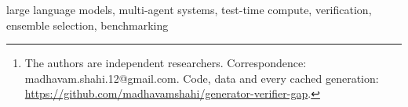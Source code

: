 \documentclass[journal]{IEEEtran}
\newif\ifanon            \anonfalse
\newif\ifwithappendix
\newif\ifpubid           \pubidfalse
\begin{document}
\title{\papertitle}

\ifanon
  \ifCLASSOPTIONconference
    \author{\IEEEauthorblockN{Anonymous Submission}
    \IEEEauthorblockA{Paper ID \#XXXX}}
  \else
    \author{Anonymous Submission}
  \fi
\else
  \ifCLASSOPTIONconference
    \author{%
    \and
    \and
    }
  \else
    \author{Madhavam Pratap Shahi, Kavish Soningra, and Nagendra Chaudhary%
    \thanks{The authors are independent researchers. Correspondence:
    madhavam.shahi.12@gmail.com. Code, data and every cached generation:
    \url{https://github.com/madhavamshahi/generator-verifier-gap}.}}
  \fi
\fi

\maketitle

\begin{abstract}

\end{abstract}

\begin{IEEEkeywords}
large language models, multi-agent systems, test-time compute, verification,
ensemble selection, benchmarking
\end{IEEEkeywords}

\ifpubid\IEEEpubidadjcol\fi









\ifwithappendix
  \appendices
  
\fi



\end{document}
